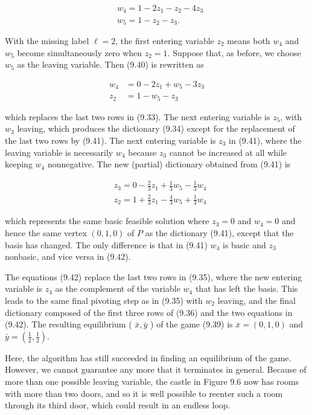 \documentclass[12pt]{article}
\begin{document}
\begin{align*}
& w_{4}=1-2 z_{1}-z_{2}-4 z_{3}  \tag{9.40}\\
& w_{5}=1-z_{2}-z_{3} .
\end{align*}


With the missing label $\ell=2$, the first entering variable $z_{2}$ means both $w_{4}$ and $w_{5}$ become simultaneously zero when $z_{2}=1$. Suppose that, as before, we choose $w_{5}$ as the leaving variable. Then (9.40) is rewritten as


\begin{align*}
w_{4} & =0-2 z_{1}+w_{5}-3 z_{3}  \tag{9.41}\\
z_{2} & =1-w_{5}-z_{3}
\end{align*}


which replaces the last two rows in (9.33). The next entering variable is $z_{5}$, with $w_{3}$ leaving, which produces the dictionary (9.34) except for the replacement of the last two rows by (9.41). The next entering variable is $z_{3}$ in (9.41), where the leaving variable is necessarily $w_{4}$ because $z_{3}$ cannot be increased at all while keeping $w_{4}$ nonnegative. The new (partial) dictionary obtained from (9.41) is


\begin{align*}
& z_{3}=0-\frac{2}{3} z_{1}+\frac{1}{3} w_{5}-\frac{1}{3} w_{4}  \tag{9.42}\\
& z_{2}=1+\frac{2}{3} z_{1}-\frac{4}{3} w_{5}+\frac{1}{3} w_{4}
\end{align*}


which represents the same basic feasible solution where $z_{3}=0$ and $w_{4}=0$ and hence the same vertex $(0,1,0)$ of $P$ as the dictionary (9.41), except that the basis has changed. The only difference is that in (9.41) $w_{4}$ is basic and $z_{3}$ nonbasic, and vice versa in (9.42).

The equations (9.42) replace the last two rows in (9.35), where the new entering variable is $z_{4}$ as the complement of the variable $w_{4}$ that has left the basis. This leads to the same final pivoting step as in (9.35) with $w_{2}$ leaving, and the final dictionary composed of the first three rows of (9.36) and the two equations in (9.42). The resulting equilibrium ( $\bar{x}, \bar{y}$ ) of the game (9.39) is $\bar{x}=(0,1,0)$ and $\bar{y}=\left(\frac{1}{2}, \frac{1}{2}\right)$.

Here, the algorithm has still succeeded in finding an equilibrium of the game. However, we cannot guarantee any more that it terminates in general. Because of more than one possible leaving variable, the castle in Figure 9.6 now has rooms with more than two doors, and so it is well possible to reenter such a room through its third door, which could result in an endless loop.
\end{document}
